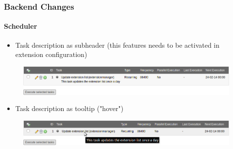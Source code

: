 
\begin{frame}[fragile]
	\frametitle{Backend Changes}
	\framesubtitle{Scheduler}

	\begin{itemize}
		\item Task description as subheader\newline
			\small(this features needs to be activated in extension configuration)\normalsize
	\end{itemize}

	\begin{figure}
		\includegraphics[width=0.95\linewidth]{Images/BackendChanges/SchedulerTaskDescriptionAsSubheader.png}
	\end{figure}

	\begin{itemize}
		\item Task description as tooltip ("hover")
	\end{itemize}

	\begin{figure}
		\includegraphics[width=0.95\linewidth]{Images/BackendChanges/SchedulerTaskDescriptionAsTooltip.png}
	\end{figure}

\end{frame}


